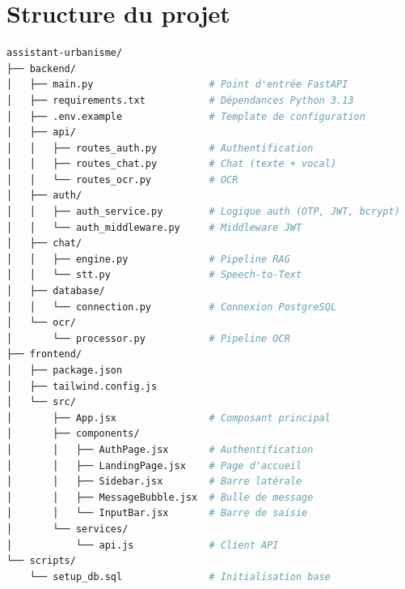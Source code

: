 \documentclass[12pt,a4paper]{report}
\begin{document}
\section{Structure du projet}

\begin{lstlisting}[language=bash, caption={Structure du projet}]
assistant-urbanisme/
├── backend/
│   ├── main.py                    # Point d'entrée FastAPI
│   ├── requirements.txt           # Dépendances Python 3.13
│   ├── .env.example               # Template de configuration
│   ├── api/
│   │   ├── routes_auth.py         # Authentification
│   │   ├── routes_chat.py         # Chat (texte + vocal)
│   │   └── routes_ocr.py          # OCR
│   ├── auth/
│   │   ├── auth_service.py        # Logique auth (OTP, JWT, bcrypt)
│   │   └── auth_middleware.py     # Middleware JWT
│   ├── chat/
│   │   ├── engine.py              # Pipeline RAG
│   │   └── stt.py                 # Speech-to-Text
│   ├── database/
│   │   └── connection.py          # Connexion PostgreSQL
│   └── ocr/
│       └── processor.py           # Pipeline OCR
├── frontend/
│   ├── package.json
│   ├── tailwind.config.js
│   └── src/
│       ├── App.jsx                # Composant principal
│       ├── components/
│       │   ├── AuthPage.jsx       # Authentification
│       │   ├── LandingPage.jsx    # Page d'accueil
│       │   ├── Sidebar.jsx        # Barre latérale
│       │   ├── MessageBubble.jsx  # Bulle de message
│       │   └── InputBar.jsx       # Barre de saisie
│       └── services/
│           └── api.js             # Client API
└── scripts/
    └── setup_db.sql               # Initialisation base
\end{lstlisting}
\end{document}
